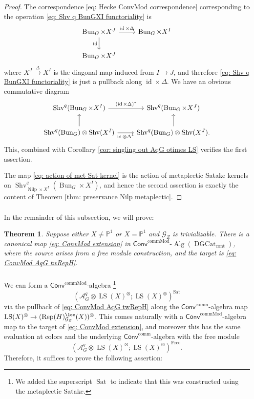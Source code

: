 \documentclass[10pt]{amsart}
\newcommand{\sssec}{\subsubsection}
\newtheorem{thm}[subsubsection]{Theorem}
\theoremstyle{remark}
\newcommand{\pjl}{\mathbb{P}^1}
\newcommand{\on}{\operatorname}
\newcommand{\cA}{\mathcal{A}}
\newcommand{\cG}{\mathcal{G}}
\newcommand{\DGcat}{\on{DGCat}_{\on{cont}}}
\newcommand{\lAlg}{\text{-}\on{Alg}}
\newcommand{\Rep}{\on{Rep}}
\newcommand{\Shv}{\on{Shv}}
\newcommand{\Nilp}{\on{Nilp}}
\newcommand{\LS}{\on{LS}}
\newcommand{\id}{\on{id}}
\newcommand{\Bun}{\on{Bun}}
\newcommand{\Convcomm}{\mathsf{Conv}^{\on{comm}}}
\newcommand{\ConvcMod}{\mathsf{Conv}^{\on{commMod}}}
\begin{document}
\begin{proof}
    The correspondence \eqref{eq: Hecke ConvMod correspondence} corresponding to the operation \eqref{eq: Shv q BunGXI functoriality} is
    \[\begin{tikzcd}
	{\Bun_G\times X^J} & {\Bun_G\times X^I} \\
	{\Bun_G\times X^J}
	\arrow["{\id\times\Delta}", from=1-1, to=1-2]
	\arrow["\id"', from=1-1, to=2-1]
\end{tikzcd}\]
where $X^J\xrightarrow{\Delta} X^I$ is the diagonal map induced from $I\rightarrow J$, and therefore \eqref{eq: Shv q BunGXI functoriality} is just a pullback along $\id\times \Delta$. We have an obvious commutative diagram
\[\begin{tikzcd}
	{\Shv^q(\Bun_G\times X^I)} & {\Shv^q(\Bun_G\times X^J)} \\
	{\Shv^q(\Bun_G)\otimes \Shv(X^I)} & {\Shv^q(\Bun_G)\otimes \Shv(X^J).}
	\arrow["{(\id\times\Delta)^*}", from=1-1, to=1-2]
	\arrow[from=2-1, to=1-1]
	\arrow["{\id\otimes \Delta^*}"', from=2-1, to=2-2]
	\arrow[from=2-2, to=1-2]
\end{tikzcd}\]
This, combined with Corollary \ref{cor: singling out AqG otimes LS} verifies the first assertion.
\medskip

    The map \eqref{eq: action of met Sat kernel} is the action of metaplectic Satake kernels on $\Shv^q_{\Nilp\times X^I}(\Bun_G\times X^I)$, and hence the second assertion is exactly the content of Theorem \ref{thm: preservance Nilp metaplectic}.
\end{proof}

\sssec{}
In the remainder of this subsection, we will prove:
\begin{thm}\label{thm: extension of action}
    Suppose either $X\ne \pjl$ or $X=\pjl$ and $\cG_Z$ is trivializable. There is a canonical map \eqref{eq: ConvMod extension} 
    in $\ConvcMod\lAlg(\DGcat)$,
    where the source arises from a free module construction, and the target is \eqref{eq: ConvMod AqG twRepH}.
\end{thm}

\sssec{}\label{sssec: two constructions}
We can form a $\ConvcMod$-algebra \footnote{We added the superscript $\on{Sat}$ to indicate that this was constructed using the metaplectic Satake.}
\begin{equation}\label{eq: ConvcMod Sat}
    (\cA^q_G\otimes \LS(X)^{\otimes};\LS(X)^{\otimes})^{\on{Sat}}
\end{equation}
via the pullback of \eqref{eq: ConvMod AqG twRepH} along the $\Convcomm$-algebra map $\LS(X)^{\otimes}\rightarrow (\Rep(H)^{\loc}_{\cG_Z}(X))^{\otimes}$. This comes naturally with a $\ConvcMod$-algebra map to the target of \eqref{eq: ConvMod extension}, and moreover this has the same evaluation at colors and the underlying $\Convcomm$-algebra with the free module 
\begin{equation}\label{eq: ConvcMod Free}
    (\cA^q_G\otimes \LS(X)^{\otimes};\LS(X)^{\otimes})^{\on{Free}}.
\end{equation}
Therefore, it suffices to prove the following assertion:
\end{document}
